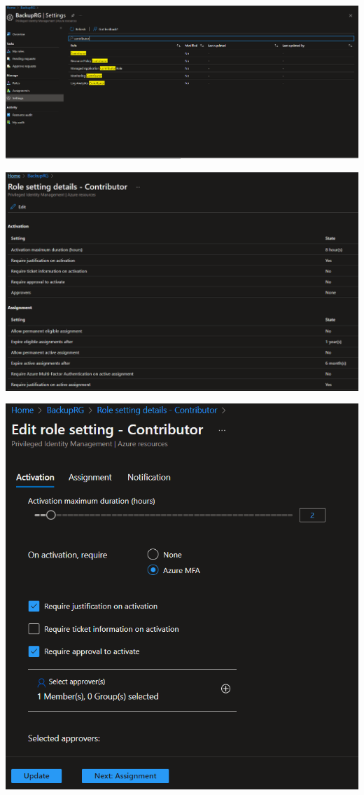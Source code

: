 \includegraphics[width=.9\linewidth]{figures/RG-setting.PNG}

\includegraphics[width=.9\linewidth]{figures/RG-setting-detailts.PNG}

\includegraphics[width=.9\linewidth]{figures/RG-role-setting.PNG}



